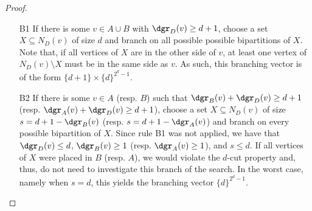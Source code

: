 \begin{proof}
    \begin{itemize}
        \item[B1] If there is some $v \in A \cup B$ with $\dgr_D(v) \geq d+1$, choose a set $X \subseteq N_D(v)$ of size $d$ and branch on all possible possible bipartitions of $X$.
        Note that, if all vertices of $X$ are in the other side of $v$, at least one vertex of $N_D(v) \setminus X$ must be in the same side as $v$.
        As such, this branching vector is of the form $\{d+1\} \times \{d\}^{2^d-1}$.




        \item[B2] If there is some $v \in A$ (resp. $B$) such that $\dgr_B(v) + \dgr_D(v) \geq d+1$ (resp. $\dgr_A(v) + \dgr_D(v) \geq d+1$), choose a set $X \subseteq N_D(v)$ of size $s = d+1 - \dgr_B(v)$ (resp. $s = d+1 - \dgr_A(v)$) and branch on every possible bipartition of $X$.
        Since rule B1 was not applied, we have that $\dgr_D(v) \leq d$, $\dgr_B(v) \geq 1$ (resp. $\dgr_A(v) \geq 1$), and $s \leq d$.
        If all vertices of $X$ were placed in $B$ (resp. $A$), we would violate the $d$-cut property and, thus, do not need to investigate this branch of the search.
        In the worst case, namely when $s = d$, this yields the branching vector $\{d\}^{2^d-1}$.
    \end{itemize}


\end{proof}
